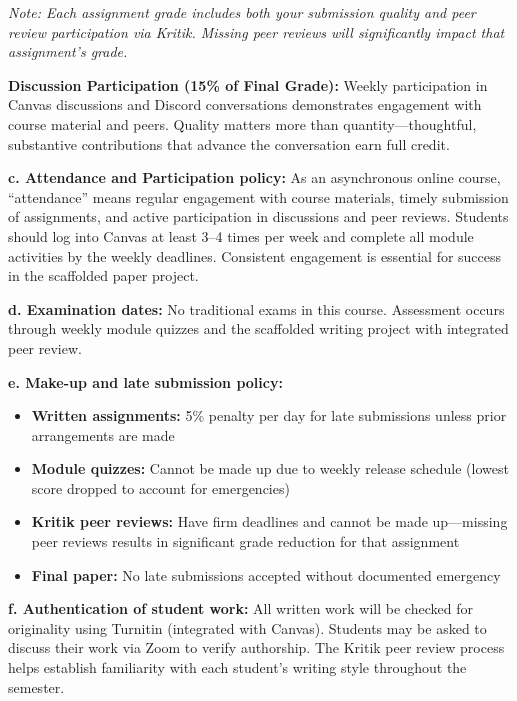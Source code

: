 \documentclass[12pt]{article}     %
\begin{document}
\textit{Note: Each assignment grade includes both your submission quality and peer review participation via Kritik. Missing peer reviews will significantly impact that assignment's grade.}

\vspace{0.5em}
\noindent \textbf{Discussion Participation (15\% of Final Grade):} Weekly participation in Canvas discussions and Discord conversations demonstrates engagement with course material and peers. Quality matters more than quantity---thoughtful, substantive contributions that advance the conversation earn full credit.

\vspace{1em}
\noindent \textbf{c. Attendance and Participation policy:}
As an asynchronous online course, ``attendance'' means regular engagement with course materials, timely submission of assignments, and active participation in discussions and peer reviews. Students should log into Canvas at least 3--4 times per week and complete all module activities by the weekly deadlines. Consistent engagement is essential for success in the scaffolded paper project.

\vspace{1em}
\noindent \textbf{d. Examination dates:}
No traditional exams in this course. Assessment occurs through weekly module quizzes and the scaffolded writing project with integrated peer review.

\vspace{1em}
\noindent \textbf{e. Make-up and late submission policy:}
\begin{itemize}
\item \textbf{Written assignments:} 5\% penalty per day for late submissions unless prior arrangements are made
\item \textbf{Module quizzes:} Cannot be made up due to weekly release schedule (lowest score dropped to account for emergencies)
\item \textbf{Kritik peer reviews:} Have firm deadlines and cannot be made up---missing peer reviews results in significant grade reduction for that assignment
\item \textbf{Final paper:} No late submissions accepted without documented emergency
\end{itemize}

\vspace{1em}
\noindent \textbf{f. Authentication of student work:}
All written work will be checked for originality using Turnitin (integrated with Canvas). Students may be asked to discuss their work via Zoom to verify authorship. The Kritik peer review process helps establish familiarity with each student's writing style throughout the semester.
\end{document}
